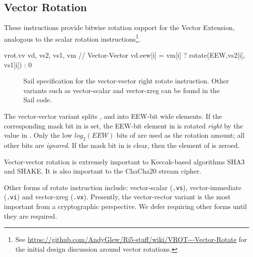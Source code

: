 \clearpage
\subsection{Vector Rotation}

These instructions provide bitwise rotation support for the
Vector Extension, analogous to the scalar rotation instructions\footnote{
See \url{https://github.com/AndyGlew/Ri5-stuff/wiki/VROT---Vector-Rotate}
for the initial design discussion around vector rotations.
}.

\begin{cryptoisa}
vrot.vv     vd, vs2, vs1, vm        // Vector-Vector
    vd.eew[i] = vm[i] ? rotate(EEW,vs2[i], vs1[i]) : 0
\end{cryptoisa}

\begin{figure}[h]

\caption{
Sail specification for the vector-vector right rotate instruction.
Other variants such as vector-scalar and vector-xreg can be found in
the Sail code.
}
\label{fig:sail:vrot}
\end{figure}

The vector-vector variant splits \vrd,  and  into
EEW-bit wide elements.
If the corresponding mask bit in \vm is set,
the EEW-bit element in  is rotated
{\em right} by the value in .
Only the low $log_2(EEW)$ bits of  are used as the rotation
amount; all other bits are {\em ignored}.
If the mask bit in \vm is clear, then the element of \vrd is zeroed.


Vector-vector rotation is extremely important to Keccak-based algorithms 
SHA3 and SHAKE.
It is also important to the ChaCha20 stream cipher.

Other forms of rotate instruction include:
vector-scalar (\texttt{.vs}),
vector-immediate (\texttt{.vi})
and
vector-xreg (\texttt{.vx}).
Presently, the vector-vector variant is the most important from a
cryptographic perspective.
We defer requiring other forms until they are required.
